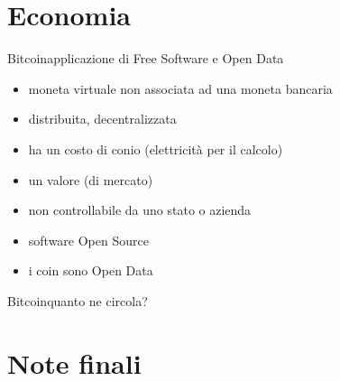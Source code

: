 \documentclass[italian,compress,red]{beamer}
\begin{document}
\section{Economia}

\begin{frame}[<+->]{ \hspace{0.3ex} Bitcoin}{applicazione di Free Software e Open Data}
 \begin{itemize}
  \item moneta virtuale non associata ad una moneta bancaria
  \item distribuita, decentralizzata
  \item ha un costo di conio (elettricità per il calcolo)
  \item un valore (di mercato)
  \item non controllabile da uno stato o azienda
  \item software Open Source
  \item i coin sono Open Data
 \end{itemize}

\end{frame}

\begin{frame}{ \hspace{0.3ex} Bitcoin}{quanto ne circola?}
\begin{center}
\end{center}
\end{frame}


\section{Note finali}
\end{document}
